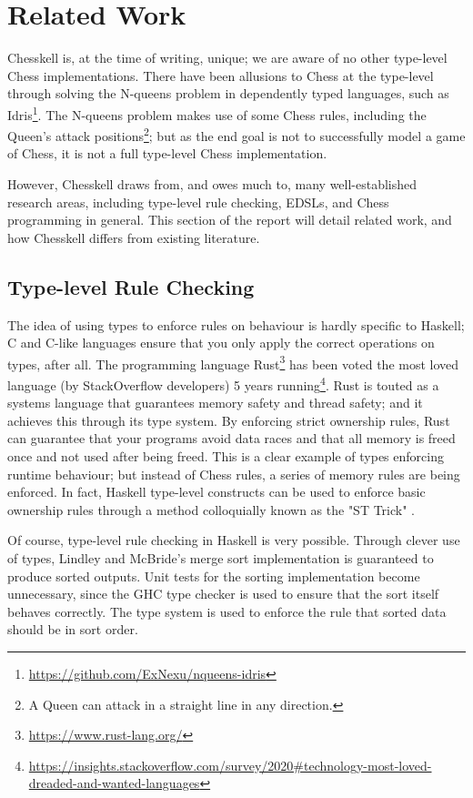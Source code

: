 \documentclass[12pt, a4paper, bibliography=totocnumbered]{scrreprt}
\begin{document}
\section{Related Work}

Chesskell is, at the time of writing, unique; we are aware of no other type-level Chess implementations. There have been allusions to Chess at the type-level through solving the N-queens problem in dependently typed languages, such as Idris\footnote{\url{https://github.com/ExNexu/nqueens-idris}}. The N-queens problem makes use of some Chess rules, including the Queen's attack positions\footnote{A Queen can attack in a straight line in any direction.}; but as the end goal is not to successfully model a game of Chess, it is not a full type-level Chess implementation.

However, Chesskell draws from, and owes much to, many well-established research areas, including type-level rule checking, EDSLs, and Chess programming in general. This section of the report will detail related work, and how Chesskell differs from existing literature.

\subsection{Type-level Rule Checking}

The idea of using types to enforce rules on behaviour is hardly specific to Haskell; C and C-like languages ensure that you only apply the correct operations on types, after all. The programming language Rust\footnote{\url{https://www.rust-lang.org/}} has been voted the most loved language (by StackOverflow developers) 5 years running\footnote{\url{https://insights.stackoverflow.com/survey/2020\#technology-most-loved-dreaded-and-wanted-languages}}. Rust is touted as a systems language that guarantees memory safety and thread safety; and it achieves this through its type system. By enforcing strict ownership rules, Rust can guarantee that your programs avoid data races and that all memory is freed once and not used after being freed. This is a clear example of types enforcing runtime behaviour; but instead of Chess rules, a series of memory rules are being enforced. In fact, Haskell type-level constructs can be used to enforce basic ownership rules through a method colloquially known as the "ST Trick" \cite{twt}.

Of course, type-level rule checking in Haskell is very possible. Through clever use of types, Lindley and McBride's merge sort implementation \cite{hasochism} is guaranteed to produce sorted outputs. Unit tests for the sorting implementation become unnecessary, since the GHC type checker is used to ensure that the sort itself behaves correctly. The type system is used to enforce the rule that sorted data should be in sort order.
\end{document}
